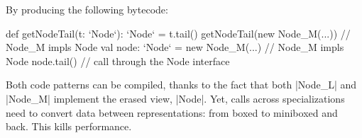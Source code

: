 By producing the following bytecode:

\begin{lstlisting-nobreak}
 def getNodeTail(t: `Node`): `Node` = t.tail()
 getNodeTail(new Node_M(...))                // Node_M impls Node
 val node: `Node` = new Node_M(...) // Node_M impls Node
 node.tail() // call through the Node interface
\end{lstlisting-nobreak}

Both code patterns can be compiled, thanks to the fact that both |Node_L| and |Node_M| implement the erased view, |Node|. Yet, calls across specializations need to convert data between rep\-re\-sen\-ta\-tions: from boxed to miniboxed and back. This kills performance.

%
%
%
%
